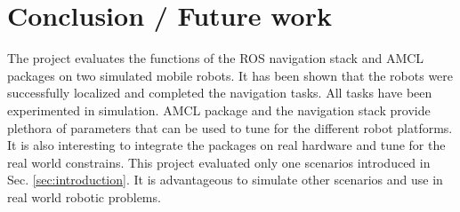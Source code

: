 \documentclass[10pt,journal,compsoc]{IEEEtran}
\begin{document}
\section{Conclusion / Future work}

The project evaluates the functions of the ROS navigation stack and AMCL packages on two simulated mobile robots. It has been shown that the robots were successfully localized and completed the navigation tasks. All tasks have been experimented in simulation. AMCL package and the navigation stack provide plethora of parameters that can be used to tune for the different robot platforms. It is also interesting  to integrate the packages on real hardware and tune for the real world constrains. This project evaluated only one scenarios introduced in Sec. \ref{sec:introduction}. It is advantageous to simulate other scenarios and use in real world robotic problems. 




\end{document}
